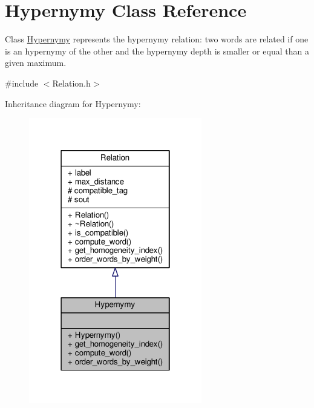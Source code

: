 \hypertarget{classHypernymy}{}\section{Hypernymy Class Reference}
\label{classHypernymy}


Class \hyperlink{classHypernymy}{Hypernymy} represents the hypernymy relation\+: two words are related if one is an hypernymy of the other and the hypernymy depth is smaller or equal than a given maximum.  




{\ttfamily \#include $<$Relation.\+h$>$}



Inheritance diagram for Hypernymy\+:\nopagebreak
\begin{figure}[H]
\begin{center}
\leavevmode
\includegraphics[width=214pt]{classHypernymy__inherit__graph}
\end{center}
\end{figure}


